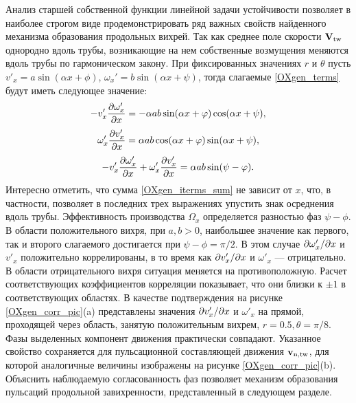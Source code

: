 Анализ старшей собственной функции линейной задачи устойчивости позволяет в наиболее строгом виде продемонстрировать ряд важных свойств найденного механизма образования продольных вихрей. Так как среднее поле скорости $\mathbf{V}_\mathrm{tw}$ однородно вдоль трубы, возникающие на нем собственные возмущения меняются вдоль трубы по гармоническом закону. При фиксированных значениях $r$ и $\theta$ пусть  $v'_x = a \sin(\alpha x + \phi)$, $\omega_x' = b \sin(\alpha x + \psi)$, тогда слагаемые \eqref{OXgen_terms} будут иметь следующее значение:
\begin{equation*} \label{OXgen_iterms_1}
 - v'_x \frac{\partial \omega'_x}{\partial x} = - \alpha a b \sin(\alpha x + \varphi) \cos(\alpha x + \psi),
\end{equation*}
\begin{equation*} \label{OXgen_iterms_2}
\omega'_x \frac{\partial v'_x}{\partial x} =  \alpha a b \cos(\alpha x + \varphi) \sin(\alpha x + \psi),
\end{equation*}
\begin{equation} \label{OXgen_iterms_sum}
 - v'_x \frac{\partial \omega'_x}{\partial x} + \omega'_x \frac{\partial v'_x}{\partial x} = \alpha a b \sin(\psi - \varphi).
\end{equation}
Интересно отметить, что сумма \eqref{OXgen_iterms_sum} не зависит от $x$, что, в частности, позволяет в последних трех выражениях упустить знак осреднения вдоль трубы. Эффективность производства  $\Omega_x$ определяется разностью фаз $\psi - \phi$. В области положительного вихря, при $a,b > 0$, наибольшее значение как первого, так и второго слагаемого достигается при $\psi - \phi = \pi/2$. В этом случае $\partial \omega'_x/\partial x$ и $v'_x$ положительно коррелированы, в то время как $\partial v'_x/\partial x$ и $\omega'_x$ --- отрицательно. В области отрицательного вихря ситуация меняется на противоположную. Расчет соответствующих коэффициентов корреляции показывает, что они близки к $\pm1$ в соответствующих областях. В качестве подтверждения на рисунке \ref{OXgen_corr_pic}(a) представлены значения $\partial v'_x/\partial x$ и $\omega'_x$ на прямой, проходящей через область, занятую положительным вихрем, $r = 0.5, \theta = \pi/8$. Фазы выделенных компонент движения практически совпадают. Указанное свойство сохраняется для пульсационной составляющей движения $\mathbf{v}_\mathrm{n,tw}$, для которой аналогичные величины изображены на рисунке \ref{OXgen_corr_pic}(b). Объяснить наблюдаемую согласованность фаз позволяет механизм образования пульсаций продольной завихренности, представленный в следующем разделе. 


